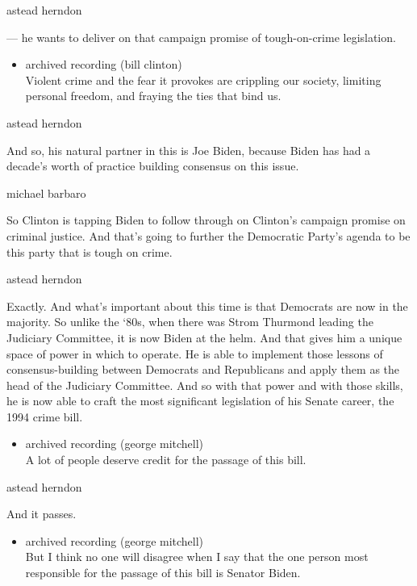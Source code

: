 astead herndon

--- he wants to deliver on that campaign promise of tough-on-crime
legislation.

\begin{itemize}
\tightlist
\item
  archived recording (bill clinton)\\
  Violent crime and the fear it provokes are crippling our society,
  limiting personal freedom, and fraying the ties that bind us.
\end{itemize}

astead herndon

And so, his natural partner in this is Joe Biden, because Biden has had
a decade's worth of practice building consensus on this issue.

michael barbaro

So Clinton is tapping Biden to follow through on Clinton's campaign
promise on criminal justice. And that's going to further the Democratic
Party's agenda to be this party that is tough on crime.

astead herndon

Exactly. And what's important about this time is that Democrats are now
in the majority. So unlike the `80s, when there was Strom Thurmond
leading the Judiciary Committee, it is now Biden at the helm. And that
gives him a unique space of power in which to operate. He is able to
implement those lessons of consensus-building between Democrats and
Republicans and apply them as the head of the Judiciary Committee. And
so with that power and with those skills, he is now able to craft the
most significant legislation of his Senate career, the 1994 crime bill.

\begin{itemize}
\tightlist
\item
  archived recording (george mitchell)\\
  A lot of people deserve credit for the passage of this bill.
\end{itemize}

astead herndon

And it passes.

\begin{itemize}
\tightlist
\item
  archived recording (george mitchell)\\
  But I think no one will disagree when I say that the one person most
  responsible for the passage of this bill is Senator Biden.
\end{itemize}

